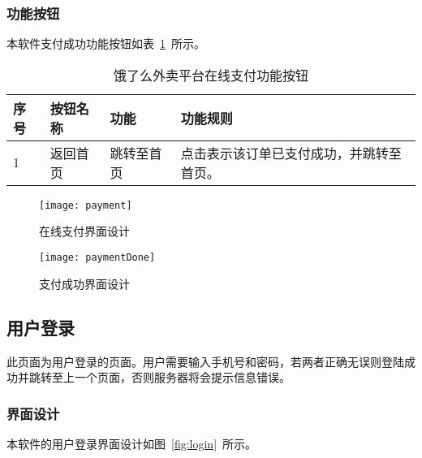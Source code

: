 \subsubsection{功能按钮}
本软件支付成功功能按钮如表~\ref{tab:table7}~所示。
\begin{table}[htbp]
    \caption{饿了么外卖平台在线支付功能按钮}\label{tab:table7}
    \vspace{0.5em}\wuhao
    \begin{tabularx}{\textwidth}{lllX}
    \toprule[1.5pt]
    序号 & 按钮名称 & 功能 & 功能规则 \\ 
    \midrule[1pt]
    1 & 返回首页 & 跳转至首页 & 点击表示该订单已支付成功，并跳转至首页。 \\
\bottomrule[1.5pt]
\end{tabularx}
\vspace{\baselineskip}
\end{table}
\begin{figure}[htbp]
    \centering
    \begin{minipage}{0.4\textwidth}
    \centering
    \texttt{[image: payment]}
    \caption{在线支付界面设计}\label{fig:payment}
    \end{minipage}
    \begin{minipage}{0.4\textwidth}
    \centering
    \texttt{[image: paymentDone]}
    \caption{支付成功界面设计}\label{fig:paymentDone}
    \end{minipage}
    \vspace{\baselineskip}
\end{figure}

\subsection{用户登录}
此页面为用户登录的页面。用户需要输入手机号和密码，若两者正确无误则登陆成功并跳转至上一个页面，否则服务器将会提示信息错误。
\subsubsection{界面设计}
本软件的用户登录界面设计如图~\ref{fig:login}~所示。
